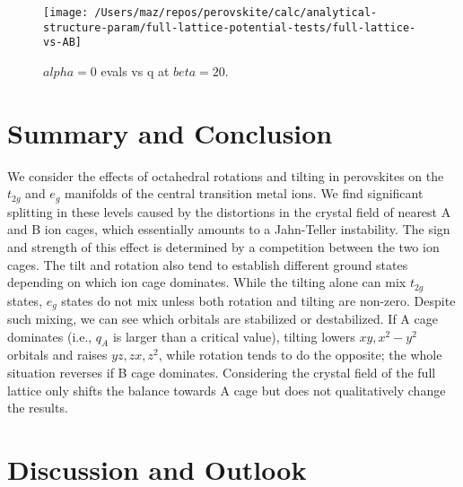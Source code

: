 \documentclass[a4paper,prb,twocolumn]{revtex4-1}  %
\begin{document}
\begin{figure}[htbp]
\begin{center}
\texttt{[image: /Users/maz/repos/perovskite/calc/analytical-structure-param/full-lattice-potential-tests/full-lattice-vs-AB]}
\caption{$alpha=0$ evals vs q at $beta=20$. 
}
\label{fig:t2g-lattice}
\end{center}
\end{figure}





\section{Summary and Conclusion}


We consider the effects of octahedral rotations and tilting in perovskites
on the $t_{2g}$ and $e_g$ manifolds of the central transition metal ions.
We find significant splitting in these levels
caused by the distortions in the crystal field of nearest A and B ion cages,
which
essentially amounts to a 
Jahn-Teller instability.
The sign and strength of this effect is 
determined by
a competition between the two ion cages.
The tilt 
and rotation 
also tend to establish different ground states
depending
on which ion cage dominates.
While the tilting alone can mix $t_{2g}$ states,
$e_g$ states
do not mix unless both rotation and tilting are non-zero.
Despite such mixing, we can see which orbitals are stabilized or destabilized.
If A cage dominates (i.e., $q_A$ is larger than a critical value),
tilting lowers
$xy,x^2-y^2$ orbitals
and raises $yz,zx,z^2$,
while 
rotation tends to do the opposite;
the whole situation reverses if B cage dominates.
Considering the crystal field of the full lattice 
only shifts the balance towards A cage
but does not qualitatively change the results.




\section{Discussion and Outlook}
\end{document}
